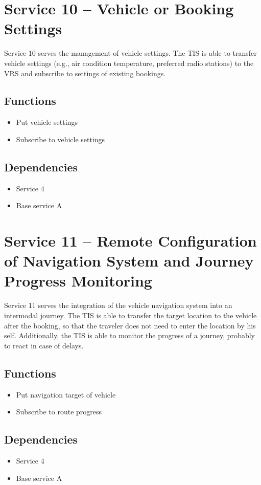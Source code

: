 \section{Service 10 -- Vehicle or Booking Settings}
Service 10 serves the management of vehicle settings. The TIS is able to transfer vehicle settings (e.g., air condition temperature, preferred radio stations) to the VRS and subscribe to settings of existing bookings.

\subsection*{Functions}
\begin{itemize}
\item Put vehicle settings 
\item Subscribe to vehicle settings
\end{itemize}

\subsection*{Dependencies}
\begin{itemize}
\item Service 4
\item Base service A
\end{itemize}

\section{Service 11 -- Remote Configuration of Navigation System and Journey Progress Monitoring}
Service 11 serves the integration of the vehicle navigation system into an intermodal journey. The TIS is able to transfer the target location to the vehicle after the booking, so that the traveler does not need to enter the location by his self. Additionally, the TIS is able to monitor the progress of a journey, probably to react in case of delays.

\subsection*{Functions}
\begin{itemize}
\item Put navigation target of vehicle
\item Subscribe to route progress
\end{itemize}

\subsection*{Dependencies}
\begin{itemize}
\item Service 4
\item Base service A
\end{itemize}
